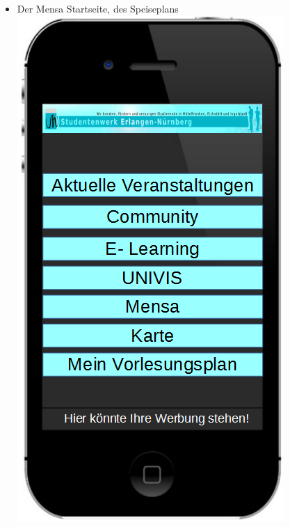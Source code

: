 \begin {itemize}
    \item Der  Mensa  Startseite, des Speiseplans\\
    \includegraphics[scale=0.4]{./inc/aufgabe05/MockupStartseite} 

\end{itemize}
